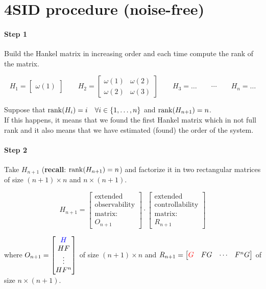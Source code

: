 \section{4SID procedure (noise-free)} \label{4sid-noisefree}

\paragraph{Step 1} \label{step1} Build the Hankel matrix in increasing order and each time compute the rank of the matrix.

\[
    H_1 = \begin{bmatrix}
        \omega(1)
    \end{bmatrix}
    \qquad
    H_2 = \begin{bmatrix}
        \omega(1) & \omega(2) \\
        \omega(2) & \omega(3)
    \end{bmatrix}
    \qquad
    H_3 = \ldots
    \qquad
    \cdots
    \qquad
    H_n = \ldots
\]

Suppose that $\operatorname*{rank} (H_i) = i \quad \forall i \in \{1, \dots, n\}$ \quad and $\operatorname*{rank} (H_{n+1}) = n$.\\
If this happens, it means that we found the first Hankel matrix which in not full rank and it also means that we have estimated (found) the order of the system.

\paragraph{Step 2} Take $H_{n+1}$ (\textbf{recall}: $\operatorname*{rank} (H_{n+1}) = n$) and factorize it in two rectangular matrices of size $(n+1) \times n$ and $n \times (n+1)$.

\[
    H_{n+1} = \begin{bmatrix}
        \text{extended} \\
        \text{observability} \\
        \text{matrix:} \\
        O_{n+1}
    \end{bmatrix} \cdot \begin{bmatrix}
        \text{extended} \\
        \text{controllability} \\
        \text{matrix:} \\
        R_{n+1}
    \end{bmatrix}
\]

where $O_{n+1} = \begin{bmatrix}
    \color{blue}H \\ HF \\ \vdots \\ HF^n
\end{bmatrix}$ of size $(n+1)\times n$ and $R_{n+1} = \begin{bmatrix}
    \color{red}G & FG & \cdots & F^nG
\end{bmatrix}$ of size $n\times (n+1)$.

